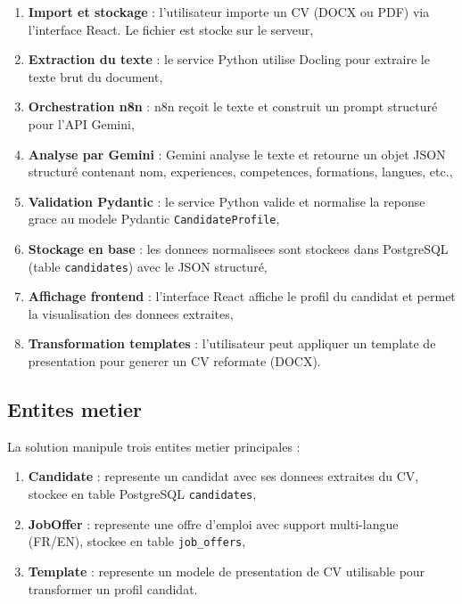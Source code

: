 \begin{enumerate}
    \item \textbf{Import et stockage} : l'utilisateur importe un CV (DOCX ou PDF) via l'interface React. Le fichier est stocke sur le serveur,
    
    \item \textbf{Extraction du texte} : le service Python utilise Docling pour extraire le texte brut du document,
    
    \item \textbf{Orchestration n8n} : n8n reçoit le texte et construit un prompt structuré pour l'API Gemini,
    
    \item \textbf{Analyse par Gemini} : Gemini analyse le texte et retourne un objet JSON structuré contenant nom, experiences, competences, formations, langues, etc.,
    
    \item \textbf{Validation Pydantic} : le service Python valide et normalise la reponse grace au modele Pydantic \texttt{CandidateProfile},
    
    \item \textbf{Stockage en base} : les donnees normalisees sont stockees dans PostgreSQL (table \texttt{candidates}) avec le JSON structuré,
    
    \item \textbf{Affichage frontend} : l'interface React affiche le profil du candidat et permet la visualisation des donnees extraites,
    
    \item \textbf{Transformation templates} : l'utilisateur peut appliquer un template de presentation pour generer un CV reformate (DOCX).
\end{enumerate}

\subsection{Entites metier}

La solution manipule trois entites metier principales :

\begin{enumerate}
    \item \textbf{Candidate} : represente un candidat avec ses donnees extraites du CV, stockee en table PostgreSQL \texttt{candidates},
    
    \item \textbf{JobOffer} : represente une offre d'emploi avec support multi-langue (FR/EN), stockee en table \texttt{job\_offers},
    
    \item \textbf{Template} : represente un modele de presentation de CV utilisable pour transformer un profil candidat.
\end{enumerate}

